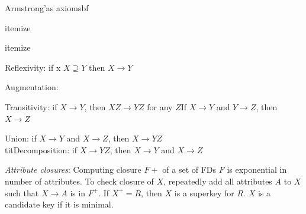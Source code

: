 \documentclass[10pt,landscape]{article}
\begin{document}
\begin{multicols}{3}
{\textit{}Armstrong'as axiomsbf

\begin{}itemize

\end{}itemize  \item Reflexivity: if x $X \supseteq Y$ then $X \rightarrow Y$
  \item Augmentation:
  \item Transitivity: if $X \rightarrow Y$, then $XZ \rightarrow YZ$ for any $Z$If $X \rightarrow Y$ and $Y \rightarrow Z$, then $X \rightarrow Z$

\item\textit{}Union: if $X \rightarrow Y$ and $X \rightarrow Z$, then $X \rightarrow YZ$ \\
\teixtxit{}tit{}Decomposition: if $X \rightarrow YZ$, then $X \rightarrow Y$ and $X \rightarrow Z$



\textit{Attribute closures}: Computing closure $F+$ of a set of FDs $F$ is exponential in number of attributes. To check closure of $X$, repeatedly add all attributes $A$ to $X$ such that $X \rightarrow A$ is in $F^+$. If $X^+ = R$, then $X$ is a superkey for $R$. $X$ is a candidate key if it is minimal.

}
\end{multicols}
\end{document}
